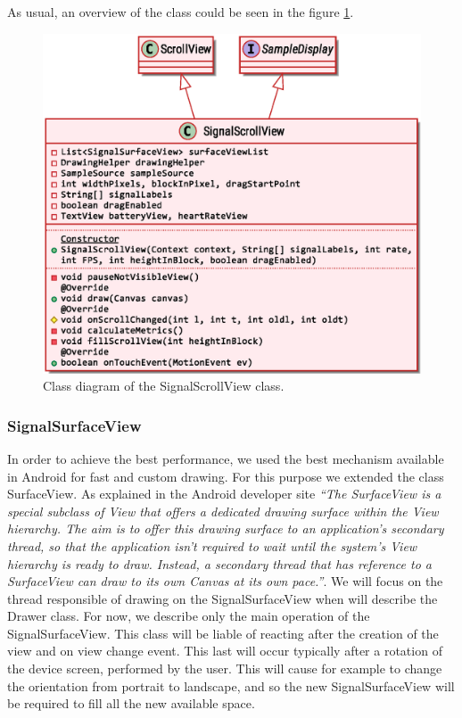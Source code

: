 	As usual, an overview of the class could be seen in the figure \ref{fig9.8}.
\begin{figure}[ht!]
	\centering
	\includegraphics[width=130mm]{figures/ch9/8.eps}
	\caption{Class diagram of the SignalScrollView class.}
	\label{fig9.8}
\end{figure}

\subsubsection{SignalSurfaceView}
In  order to achieve the best performance, we used the best mechanism available in Android for fast and custom drawing. For this purpose we extended the class SurfaceView. As explained in the Android developer site \textit{“The SurfaceView is a special subclass of View that offers a dedicated drawing surface within the View hierarchy. The aim is to offer this drawing surface to an application's secondary thread, so that the application isn't required to wait until the system's View hierarchy is ready to draw. Instead, a secondary thread that has reference to a SurfaceView can draw to its own Canvas at its own pace.”}\cite{ref25}. We will focus on the thread responsible of drawing on the SignalSurfaceView when will describe the Drawer class. For now, we describe only the main operation of the SignalSurfaceView. This class will be liable of reacting after the creation of the view and on view change event. This last will occur typically after a rotation of the device screen, performed by the user. This will cause for example to change the orientation from portrait to landscape, and so the new SignalSurfaceView will be required to fill all the new available space.

